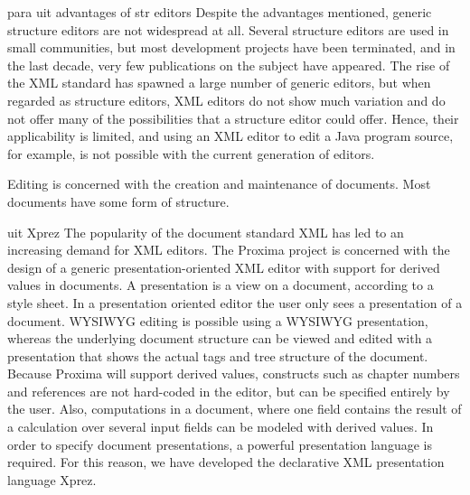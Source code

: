 \bc para uit advantages of str editors
Despite the advantages mentioned, generic structure editors are not widespread at all. Several structure editors are used in small communities, but most development projects have been terminated, and in the last decade, very few publications on the subject have appeared. The rise of the XML standard has spawned a large number of generic editors, but when regarded as structure editors, XML editors do not show much variation and do not offer many of the possibilities that a structure editor could offer. Hence, their applicability is limited, and using an XML editor to edit a Java program source, for example, is not possible with the current generation of editors.
\ec







%								
%								
%								


\bc
Editing is concerned with the creation and maintenance of documents.  
Most documents have some form of structure. 
\ec

\bc uit Xprez
The popularity of the document standard XML has led to an increasing demand for XML editors. The Proxima project is concerned with the design of a generic presentation-oriented XML editor with support for derived values in documents. A presentation is a view on a document, according to a style sheet. In a presentation oriented editor the user only sees a presentation of a document. WYSIWYG editing is possible using a WYSIWYG presentation, whereas the underlying document structure can be viewed and edited with a presentation that shows the actual tags and tree structure of the document. Because Proxima will support derived values, constructs such as chapter numbers and references are not hard-coded in the editor, but can be specified entirely by the user. Also, computations in a document, where one field contains the result of a calculation over several input fields can be modeled with derived values. In order to specify document presentations, a powerful presentation language is required. For this reason, we have developed the declarative XML presentation language {\sc Xprez}.
\ec




%
%
%
%
%


